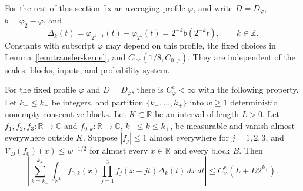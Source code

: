 For the rest of this section fix an averaging profile \(\varphi\), and
write \(D=D_\varphi\), \(b=\varphi_2-\varphi\), and
\[
 \Delta_k(t)=\varphi_{2^{k+1}}(t)-\varphi_{2^k}(t)
            =2^{-k}b(2^{-k}t),\qquad k\in\mathbb Z.
\]
Constants with subscript \(\varphi\) may depend on this profile, the
fixed choices in Lemma~\ref{lem:transfer-kernel}, and
\(C_{\mathrm{loc}}(1/8,C_{0,\varphi})\).  They are independent of
the scales, blocks, inputs, and probability system.

\begin{lemma}
\label{lem:transfer-continuous}
For the fixed profile \(\varphi\) and \(D=D_\varphi\), there is
\(C_\varphi^{\mathrm c}<\infty\) with the following property.
Let \(k_-\leq k_+\) be integers, and partition
\(\{k_-,\ldots,k_+\}\) into \(w\geq1\) deterministic nonempty consecutive
blocks.  Let \(K\subset\mathbb R\) be an interval of length \(L>0\).
Let \(f_1,f_2,f_3:\mathbb R\to\mathbb C\) and
\(f_{0,k}:\mathbb R\to\mathbb C\), \(k_-\leq k\leq k_+\), be measurable
and vanish almost everywhere outside \(K\).  Suppose
\(|f_j|\leq1\) almost everywhere for \(j=1,2,3\), and
\(\mathcal V_B(f_0)(x)\leq w^{-1/2}\) for almost every \(x\in\mathbb R\)
and every block \(B\).
Then
\begin{equation}
 \left|\sum_{k=k_-}^{k_+}\int_{\mathbb R^2}
       f_{0,k}(x)\prod_{j=1}^3f_j(x+jt)\Delta_k(t)\,dx\,dt\right|
       \leq C_\varphi^{\mathrm c}(L+D2^{k_+}).
 \label{eq:transfer-continuous}
\end{equation}
\end{lemma}

